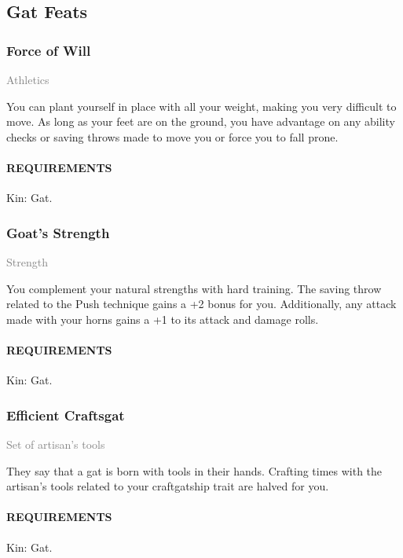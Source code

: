     \subsection*{Gat Feats}
        \subsubsection{Force of Will} \label{feat::forceofwill}
        \small{\textcolor{gray}{Athletics}}

        \normalsize
        You can plant yourself in place with all your weight, making you very difficult to move.
        As long as your feet are on the ground, you have advantage on any ability checks or saving throws made to move you or force you to fall prone.
        \paragraph{REQUIREMENTS} Kin: Gat.

        \subsubsection{Goat's Strength} \label{feat::goatsstrength}
        \small{\textcolor{gray}{Strength}}

        \normalsize
        You complement your natural strengths with hard training.
        The saving throw related to the Push technique gains a +2 bonus for you.
        Additionally, any attack made with your horns gains a +1 to its attack and damage rolls.
        \paragraph{REQUIREMENTS} Kin: Gat.

        \subsubsection{Efficient Craftsgat} \label{feat::efficientcraftsgat}
        \small{\textcolor{gray}{Set of artisan's tools}}

        \normalsize
        They say that a gat is born with tools in their hands.
        Crafting times with the artisan's tools related to your craftgatship trait are halved for you.
        \paragraph{REQUIREMENTS} Kin: Gat.

